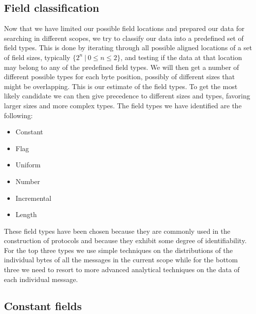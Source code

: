 \documentclass[a4paper]{report}
\begin{document}
\subsection{Field classification}
Now that we have limited our possible field locations and prepared our data for
searching in different scopes, we try to classify our data into a predefined
set of field types. This is done by iterating through all possible aligned
locations of a set of field sizes, typically $\{2^n~|~0 \le n \le 2\}$, and
testing if the data at that location may belong to any of the predefined field
types. We will then get a number of different possible types for each byte
position, possibly of different sizes that might be overlapping. This is our
estimate of the field types. To get the most likely candidate we can then give
precedence to different sizes and types, favoring larger sizes and more complex
types. The field types we have identified are the following:

\begin{itemize}
    \item Constant
    \item Flag
    \item Uniform
    \item Number
    \item Incremental
    \item Length
\end{itemize}

These field types have been chosen because they are commonly used in the
construction of protocols and because they exhibit some degree of
identifiability. For the top three types we use simple techniques on the
distributions of the individual bytes of all the messages in the current scope
while for the bottom three we need to resort to more advanced analytical
techniques on the data of each individual message.

\subsection{Constant fields}
\end{document}
